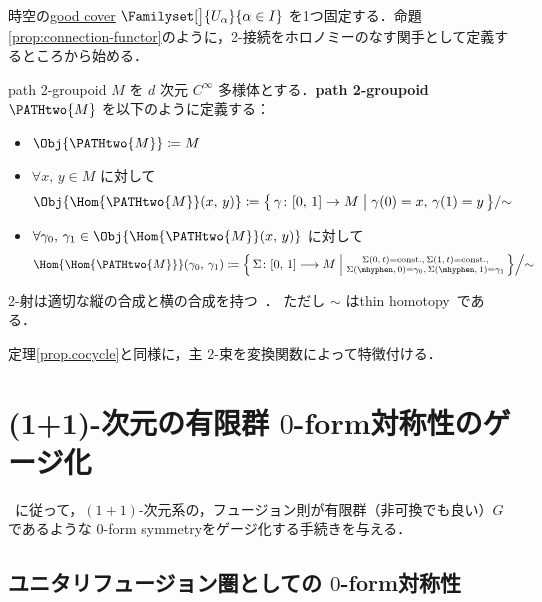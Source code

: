 \documentclass[TQFT_main]{subfiles}
\begin{document}
時空の\hyperref[def:good-cover]{good cover} $\Familyset[\big]{U_\alpha}{\alpha \in I}$ を1つ固定する．命題\ref{prop:connection-functor}のように，2-接続をホロノミーのなす関手として定義するところから始める．

\begin{mydef}[label=def:path2grpd]{path 2-groupoid}
    $M$ を $d$ 次元 $C^\infty$ 多様体とする．\textbf{path 2-groupoid} $\PATHtwo{M}$ を以下のように定義する：
    \begin{itemize}
        \item $\Obj{\PATHtwo{M}} \coloneqq M$
        \item $\forall x,\, y \in M$ に対して
        \begin{align}
            \Obj{\Hom{\PATHtwo{M}}(x,\, y)} \coloneqq \bigl\{\, \gamma \colon [0,\, 1] \to M \bigm| \gamma(0) = x,\, \gamma(1) = y \,\bigr\} /{\sim}
        \end{align}
        \item $\forall \gamma_0,\, \gamma_1 \in \Obj{\Hom{\PATHtwo{M}}(x,\, y)}$ に対して
        \begin{align}
            \Hom{\Hom{\PATHtwo{M}}} (\gamma_0,\, \gamma_1) \coloneqq \Bigl\{\, \Sigma \colon [0,\, 1] \lto M \Bigm| \substack{\Sigma(0,\, t) = \mathrm{const.},\, \Sigma(1,\, t) = \mathrm{const.}, \\ \Sigma (\mhyphen,\, 0) = \gamma_0,\, \Sigma (\mhyphen,\, 1) = \gamma_1 }\,\Bigr\} \Big{/} {\sim}
        \end{align}
    \end{itemize}
    2-射は適切な縦の合成と横の合成を持つ~\cite[Definition20, p.20]{BaezSchreiber2004HGT1}．
    ただし $\sim$ はthin homotopy~\cite[Definition19, p.20]{BaezSchreiber2004HGT1}である．
\end{mydef}

定理\ref{prop.cocycle}と同様に，主 $2$-束を変換関数によって特徴付ける．

\section{(1+1)-次元の有限群 $0$-form対称性のゲージ化}

~\cite{BhardwajTachikawa2017gauging2d}に従って，$(1+1)$-次元系の，フュージョン則が有限群（非可換でも良い）$G$ であるような $0$-form symmetryをゲージ化する手続きを与える．

\subsection{ユニタリフュージョン圏としての $0$-form対称性}
\end{document}
